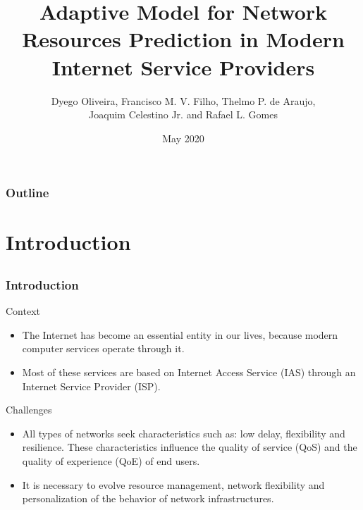 \documentclass[aspectratio=169]{beamer}
\begin{document}
\title[]{\textbf{Adaptive Model for Network Resources Prediction in Modern Internet Service Providers}}  

\author[Dyego Oliveira]{Dyego Oliveira, Francisco M. V. Filho, Thelmo P. de Araujo, \\ Joaquim Celestino Jr. and Rafael L. Gomes}


\date{May 2020} 

\begin{frame}
\titlepage

\end{frame}


\begin{frame}
\frametitle{Outline }
\tableofcontents
\end{frame} 


\section{Introduction}


\subsection{}
\begin{frame}
\frametitle{Introduction}
\begin{block}{Context}
    \begin{itemize}
        \item The Internet has become an essential entity in our lives, because modern computer services operate through it.
        \item Most of these services are based on Internet Access Service (IAS) through an Internet Service Provider (ISP).
    \end{itemize}
\end{block}

\begin{block}{Challenges}
\begin{itemize}
    \item All types of networks seek characteristics such as: low delay, flexibility and resilience. These characteristics influence the quality of service (QoS) and the quality of experience (QoE) of end users.
    \item It is necessary to evolve resource management, network flexibility and personalization of the behavior of network infrastructures.
\end{itemize}
\end{block}
\end{frame}
\end{document}
